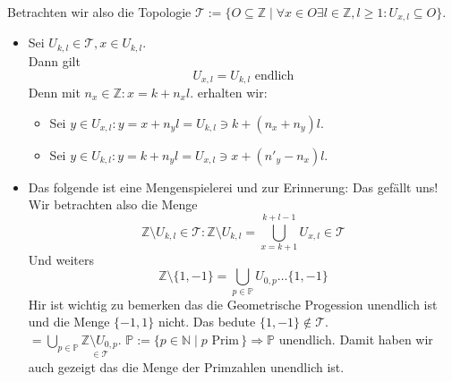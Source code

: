 Betrachten wir also die Topologie 
$\mathcal{T} := \{ O \subseteq \mathbb{Z} \mid \forall x \in O \exists l \in \mathbb{Z}, l \ge 1 : U_{x,l} \subseteq O\}$.
\begin{itemize}
    \item Sei $U_{k,l} \in \mathcal{T}, x \in U_{k,l}$. \\
    Dann gilt $$U_{x,l}=U_{k,l} \text{ endlich}$$
    Denn mit $n_x \in \mathbb{Z}: x = k + n_x l$. erhalten wir: \\
    \begin{itemize}
        \item Sei $y \in U_{x,l}: y = x + n_y l = U_{k,l} \ni k + (n_x + n_y)l$.\\
        \item Sei $y \in U_{k,l}: y = k + n_y l = U_{x,l} \ni x + (n'_y - n_{x})l$.
    \end{itemize}

    \item Das folgende ist eine Mengenspielerei und zur Erinnerung: Das gefällt uns!\\
    Wir betrachten also die Menge $$\mathbb{Z} \setminus U_{k,l} \in \mathcal{T}: \mathbb{Z} \setminus U_{k,l} 
    = \underset{x= k+1}{\overset{k+l-1}{\bigcup}} U_{x,l} \in \mathcal{T}$$
    Und weiters 
    $$\mathbb{Z}\setminus\{1,-1\} = \underset{p \in \mathbb{P}}{\bigcup} U_{0,p} \dots \{1,-1\}$$
    Hir ist wichtig zu bemerken das die Geometrische Progession unendlich ist und die Menge $\{-1,1\}$ nicht. 
    Das bedute $\{1,-1\} \notin \mathcal{T}$.\\
    $= \underset{p \in \mathbb{P}}{\bigcup}\underset{\in \mathcal{T}}{\mathbb{Z}\setminus{U_{0,p}}}$. 
    $\mathbb{P}:= \{p \in \mathbb{N} \mid p \text{ Prim} \,\} \Rightarrow \mathbb{P} \text{ unendlich}$.
    Damit haben wir auch gezeigt das die Menge der Primzahlen unendlich ist.
    
\end{itemize}

